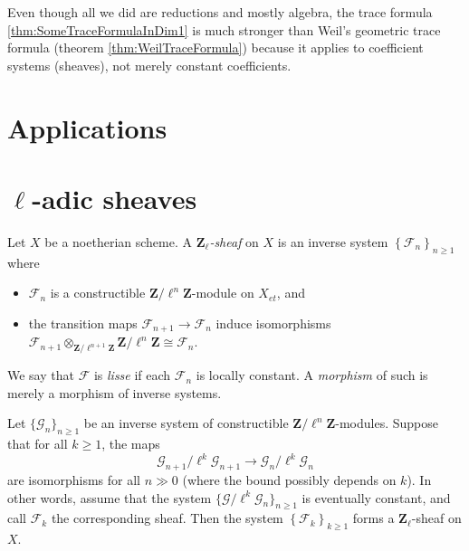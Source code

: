 \begin{remark}
Even though all we did are reductions and mostly algebra, the trace formula 
\ref{thm:SomeTraceFormulaInDim1} is much stronger than Weil's geometric trace 
formula (theorem \ref{thm:WeilTraceFormula}) because it applies to coefficient 
systems (sheaves), not merely constant coefficients. 
\end{remark}

\section{Applications}


\section{$\ell$-adic sheaves}

\begin{definition}
Let $X$ be a noetherian scheme. A {\it $\mathbf{Z}_\ell$-sheaf} on $X$ is an 
inverse system $\left\{\mathcal{F}_n\right\}_{n\geq 1}$ where
\begin{itemize}
\item 
$\mathcal{F}_n$ is a constructible $\mathbf{Z}/\ell^n\mathbf{Z}$-module on 
$X_{et}$, and
\item 
the transition maps $\mathcal{F}_{n+1}\to \mathcal{F}_n$ induce isomorphisms 
$\mathcal{F}_{n+1}\otimes_{\mathbf{Z}/\ell^{n+1}\mathbf{Z}} 
\mathbf{Z}/\ell^n\mathbf{Z} \cong \mathcal{F}_n$.
\end{itemize}
We say that $\mathcal{F}$ is {\it lisse} if each $\mathcal{F}_n$ is locally 
constant. A {\it morphism} of such is merely a morphism of inverse systems.
\end{definition}

\begin{lemma} \label{lem:EventuallyCstInverseSystems}
Let $\{\mathcal{G}_n\}_{n\geq 1}$ be an inverse system of constructible 
$\mathbf{Z}/\ell^n\mathbf{Z}$-modules. Suppose that for all $k\geq 1$, the maps
$$
\mathcal{G}_{n+1}/\ell^k \mathcal{G}_{n+1}\to \mathcal{G}_n /\ell^k 
\mathcal{G}_n
$$
are isomorphisms for all $n\gg 0$ (where the bound possibly depends on $k$). In 
other words, assume that the system $\{\mathcal{G}/\ell^k\mathcal{G}_n\}_{n\geq 
1}$ is eventually constant, and call $\mathcal{F}_k$ the corresponding sheaf. 
Then the system $\left\{\mathcal{F}_k\right\}_{k\geq 1}$ forms a 
$\mathbf{Z}_\ell$-sheaf on $X$.
\end{lemma}

